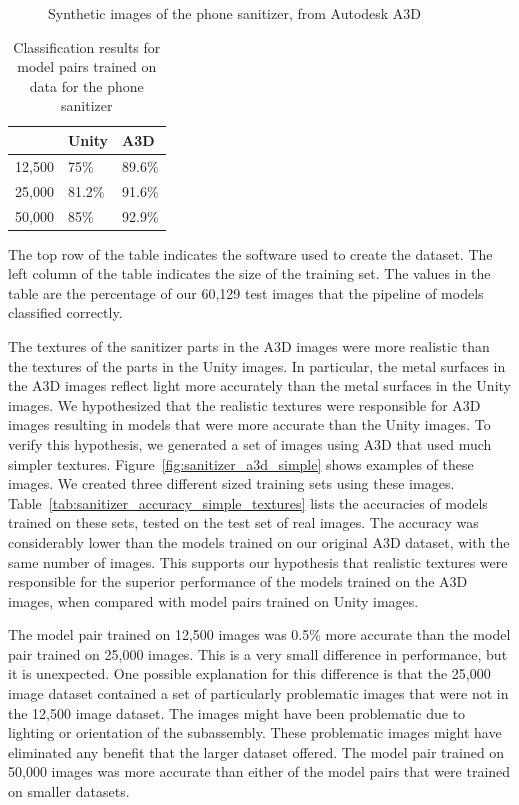 \begin{figure}
  \caption{
    Synthetic images of the phone sanitizer, from Autodesk A3D
  }\label{fig:sanitizer_a3d}
\end{figure}

\begin{table}[h]
\begin{tabular}{|l||l|l|}
  \hline
  & Unity & A3D\\
  \hline
  \hline
  12,500 & 75\% & 89.6\% \\
  \hline
  25,000 & 81.2\% & 91.6\%\\
  \hline
  50,000 & 85\% & 92.9\%\\
  \hline
\end{tabular}
\begin{captiontext}
    The top row of the table indicates the software used to create the dataset.
    The left column of the table indicates the size of the training set.
    The values in the table are the percentage of our 60,129 test images that
    the pipeline of models classified correctly.
  \end{captiontext}
  \caption{
    Classification results for model pairs trained on data for the phone
    sanitizer
  }\label{tab:sanitizer_accuracy}
\end{table}

The textures of the sanitizer parts in the A3D images were more realistic than
the textures of the parts in the Unity images.
In particular, the metal surfaces in the A3D images reflect light more
accurately than the metal surfaces in the Unity images.
We hypothesized that the realistic textures were responsible for A3D images
resulting in models that were more accurate than the Unity images.
To verify this hypothesis, we generated a set of images using A3D that used much
simpler textures.
Figure~\ref{fig:sanitizer_a3d_simple} shows examples of these images.
We created three different sized training sets using these images.
Table~\ref{tab:sanitizer_accuracy_simple_textures} lists the accuracies of
models trained on these sets, tested on the test set of real images.
The accuracy was considerably lower than the models trained on our original A3D
dataset, with the same number of images.
This supports our hypothesis that realistic textures were responsible for
the superior performance of the models trained on the A3D images, when
compared with model pairs trained on Unity images.

The model pair trained on 12,500 images was 0.5\% more accurate than the model
pair trained on 25,000 images.
This is a very small difference in performance, but it is unexpected.
One possible explanation for this difference is that the 25,000 image dataset
contained a set of particularly problematic images that were not in the 12,500
image dataset.
The images might have been problematic due to lighting or orientation of the
subassembly.
These problematic images might have eliminated any benefit that the larger
dataset offered.
The model pair trained on 50,000 images was more accurate than either of the
model pairs that were trained on smaller datasets.

